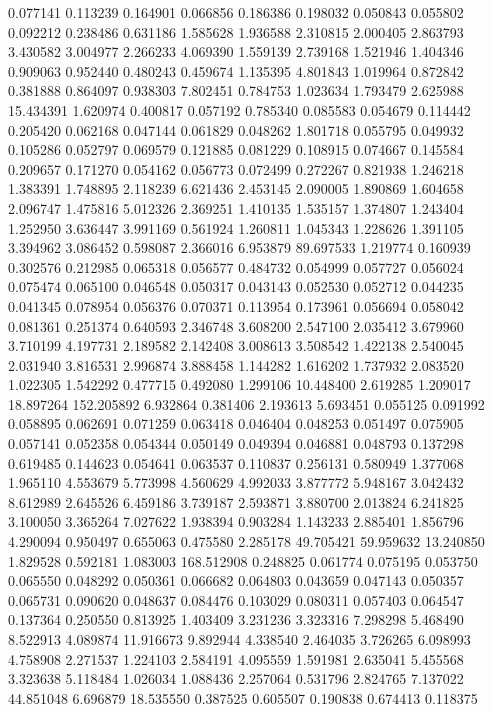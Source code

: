 0.077141
0.113239
0.164901
0.066856
0.186386
0.198032
0.050843
0.055802
0.092212
0.238486
0.631186
1.585628
1.936588
2.310815
2.000405
2.863793
3.430582
3.004977
2.266233
4.069390
1.559139
2.739168
1.521946
1.404346
0.909063
0.952440
0.480243
0.459674
1.135395
4.801843
1.019964
0.872842
0.381888
0.864097
0.938303
7.802451
0.784753
1.023634
1.793479
2.625988
15.434391
1.620974
0.400817
0.057192
0.785340
0.085583
0.054679
0.114442
0.205420
0.062168
0.047144
0.061829
0.048262
1.801718
0.055795
0.049932
0.105286
0.052797
0.069579
0.121885
0.081229
0.108915
0.074667
0.145584
0.209657
0.171270
0.054162
0.056773
0.072499
0.272267
0.821938
1.246218
1.383391
1.748895
2.118239
6.621436
2.453145
2.090005
1.890869
1.604658
2.096747
1.475816
5.012326
2.369251
1.410135
1.535157
1.374807
1.243404
1.252950
3.636447
3.991169
0.561924
1.260811
1.045343
1.228626
1.391105
3.394962
3.086452
0.598087
2.366016
6.953879
89.697533
1.219774
0.160939
0.302576
0.212985
0.065318
0.056577
0.484732
0.054999
0.057727
0.056024
0.075474
0.065100
0.046548
0.050317
0.043143
0.052530
0.052712
0.044235
0.041345
0.078954
0.056376
0.070371
0.113954
0.173961
0.056694
0.058042
0.081361
0.251374
0.640593
2.346748
3.608200
2.547100
2.035412
3.679960
3.710199
4.197731
2.189582
2.142408
3.008613
3.508542
1.422138
2.540045
2.031940
3.816531
2.996874
3.888458
1.144282
1.616202
1.737932
2.083520
1.022305
1.542292
0.477715
0.492080
1.299106
10.448400
2.619285
1.209017
18.897264
152.205892
6.932864
0.381406
2.193613
5.693451
0.055125
0.091992
0.058895
0.062691
0.071259
0.063418
0.046404
0.048253
0.051497
0.075905
0.057141
0.052358
0.054344
0.050149
0.049394
0.046881
0.048793
0.137298
0.619485
0.144623
0.054641
0.063537
0.110837
0.256131
0.580949
1.377068
1.965110
4.553679
5.773998
4.560629
4.992033
3.877772
5.948167
3.042432
8.612989
2.645526
6.459186
3.739187
2.593871
3.880700
2.013824
6.241825
3.100050
3.365264
7.027622
1.938394
0.903284
1.143233
2.885401
1.856796
4.290094
0.950497
0.655063
0.475580
2.285178
49.705421
59.959632
13.240850
1.829528
0.592181
1.083003
168.512908
0.248825
0.061774
0.075195
0.053750
0.065550
0.048292
0.050361
0.066682
0.064803
0.043659
0.047143
0.050357
0.065731
0.090620
0.048637
0.084476
0.103029
0.080311
0.057403
0.064547
0.137364
0.250550
0.813925
1.403409
3.231236
3.323316
7.298298
5.468490
8.522913
4.089874
11.916673
9.892944
4.338540
2.464035
3.726265
6.098993
4.758908
2.271537
1.224103
2.584191
4.095559
1.591981
2.635041
5.455568
3.323638
5.118484
1.026034
1.088436
2.257064
0.531796
2.824765
7.137022
44.851048
6.696879
18.535550
0.387525
0.605507
0.190838
0.674413
0.118375
